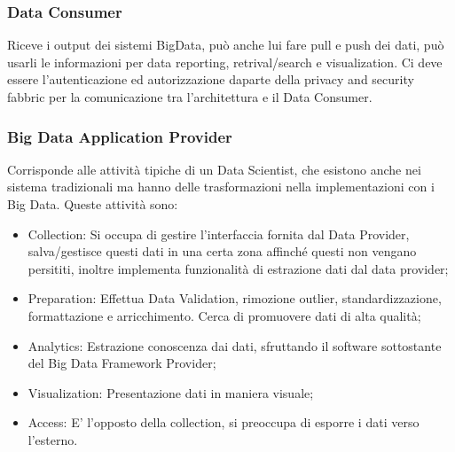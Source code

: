 \documentclass[11pt, twocolumn]{article}
\newenvironment{myitemize}
{ \begin{itemize}
		\setlength{\itemsep}{0pt}
		\setlength{\parskip}{0pt}
		\setlength{\parsep}{0pt}     }
	{ \end{itemize}                  }
\begin{document}
\subsubsection{Data Consumer}
Riceve i output dei sistemi BigData, può anche lui fare pull e push dei dati, può usarli le informazioni per data reporting, retrival/search e visualization. Ci deve essere l'autenticazione ed autorizzazione daparte della privacy and security fabbric per la comunicazione tra l'architettura e il Data Consumer.

\subsubsection{Big Data Application Provider}
Corrisponde alle attività tipiche di un Data Scientist, che esistono anche nei sistema tradizionali ma hanno delle trasformazioni nella implementazioni con i Big Data. Queste attività sono:
\begin{myitemize}
	\item Collection: Si occupa di gestire l'interfaccia fornita dal Data Provider, salva/gestisce questi dati in una certa zona affinché questi non vengano persititi, inoltre implementa funzionalità di estrazione dati dal data provider;
	\item Preparation: Effettua Data Validation, rimozione outlier, standardizzazione, formattazione e arricchimento. 
	Cerca di promuovere dati di alta qualità;
	\item Analytics: Estrazione conoscenza dai dati, sfruttando il software sottostante del Big Data Framework Provider;
	\item Visualization: Presentazione dati in maniera visuale;
	\item Access: E' l'opposto della collection, si preoccupa di esporre i dati verso l'esterno. 
\end{myitemize}
\end{document}
